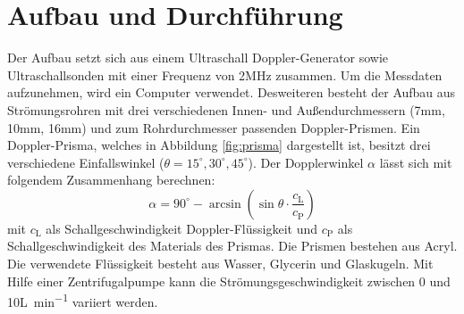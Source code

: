\section {Aufbau und Durchführung}
\label{sec:durchführung}

Der Aufbau setzt sich aus einem Ultraschall Doppler-Generator sowie Ultraschallsonden mit einer Frequenz von 2\si{\mega\Hz} zusammen. Um die Messdaten aufzunehmen, wird ein Computer verwendet. Desweiteren besteht der Aufbau aus Strömungsrohren mit drei verschiedenen Innen- und Außendurchmessern (7\si{\milli\meter}, 10\si{\milli\meter}, 16\si{\milli\meter}) und zum Rohrdurchmesser passenden Doppler-Prismen. Ein Doppler-Prisma, welches in Abbildung \ref{fig:prisma} dargestellt ist, besitzt drei verschiedene Einfallswinkel ($\theta = 15^\circ, 30^\circ, 45^\circ$). Der Dopplerwinkel $\alpha$ lässt sich mit folgendem Zusammenhang berechnen:
\begin{equation}
   \alpha = 90^\circ -\arcsin \left(\sin\theta\cdot\frac{c_\mathrm{L}}{c_\mathrm{P}}\right)
\end{equation}
mit $c_\mathrm{L}$ als Schallgeschwindigkeit Doppler-Flüssigkeit und $c_\mathrm{P}$ als Schallgeschwindigkeit des Materials des Prismas. Die Prismen bestehen aus Acryl.
Die verwendete Flüssigkeit besteht aus Wasser, Glycerin und Glaskugeln. Mit Hilfe einer Zentrifugalpumpe kann die Strömungsgeschwindigkeit zwischen 0 und 10\si{\liter\per\minute} variiert werden.

